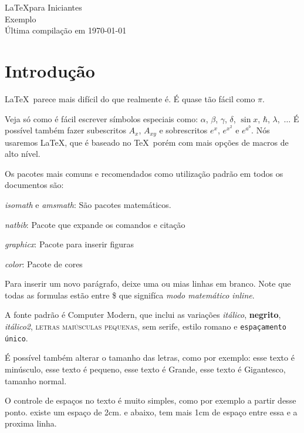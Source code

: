 \documentclass[portuguese,brazilian,12pt,final]{article}
\begin{document}
\begin{center}
{\large \LaTeX para Iniciantes\\ Exemplo} \\ %
Última compilação em \today
\end{center}

\section{Introdução}

\LaTeX\ parece mais difícil do que realmente é. É quase tão fácil como $\pi$.

Veja só como é fácil escrever símbolos especiais como: $\alpha$,
$\beta$, $\gamma$,
$\delta$, $\sin x$, $\hbar$, $\lambda$,~$\ldots$
É possível também fazer subescritos $A_{x}$, $A_{xy}$
e sobrescritos  $e^x$, $e^{x^2}$ e
$e^{a^b}$.
Nós usaremos \LaTeX, que é baseado no \TeX\ porém com mais opções de macros de alto nível.

Os pacotes mais comuns e recomendados como utilização padrão em todos os documentos são:

\emph{isomath} e \emph{amsmath}: São pacotes matemáticos.

\emph{natbib}: Pacote que expande os comandos e citação

\emph{graphicx}: Pacote para inserir figuras

\emph{color}: Pacote de cores



Para inserir um novo parágrafo, deixe uma ou mias linhas em branco.
Note que todas as formulas estão entre
\$ que signifíca \textit{modo matemático inline}.

A fonte padrão é Computer Modern, que inclui as variações \textit{itálico},
\textbf{negrito},
\textsl{itálico2}, \textsc{letras maiúsculas pequenas}, \textsf{sem serife}, \textrm{estilo romano} e \texttt{espaçamento único}.

É possível também alterar o tamanho das letras, como por exemplo: \tiny esse texto é minúsculo, \small esse texto é pequeno, \Large esse texto é Grande, \Huge esse texto é Gigantesco, \normalsize tamanho normal.

O controle de espaços no texto é muito simples, como por exemplo a partir desse ponto. \hspace{2cm} existe um espaço de 2cm. e abaixo, tem mais 1cm de espaço entre essa e a proxima linha.

\vspace{1cm}
\end{document}
